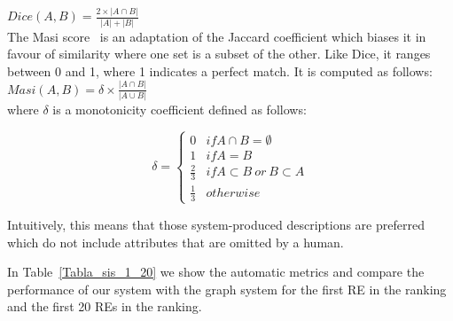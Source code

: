 $Dice(A,B) = \frac{2\times|A \cap B|}{|A|+|B|}$\\


The Masi score \cite{Passonneau06measuringagreement}~is an adaptation of the Jaccard coefficient
which biases it in favour of similarity where one set
is a subset of the other. Like Dice, it ranges between
0 and 1, where 1 indicates a perfect match. It is computed as follows:\\


$Masi(A,B) = \delta \times \frac{|A \cap B|}{|A \cup B|}$ \\


where $\delta$ is a monotonicity coefficient defined as follows:


 \begin{equation}
     \delta  = \left\{
	       \begin{array}{ll}
		 0      & if A \cap B = \emptyset \\
		 1 & if A = B  \\
		 \frac{2}{3}     & if A \subset B ~or~ B \subset A\\
		 \frac{1}{3}     & otherwise
	       \end{array}
	     \right.
 \end{equation}


Intuitively, this
means that those system-produced descriptions are
preferred which do not include attributes that are
omitted by a human.  

In Table~\ref{Tabla_sis_1_20} we show the automatic metrics and compare the performance of our system  with the graph system for the first RE in the ranking and the first 20 REs in the ranking. 

